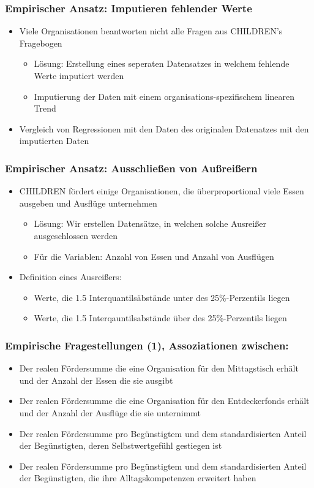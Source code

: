 \begin{frame}[fragile]
\frametitle{Empirischer Ansatz: Imputieren fehlender Werte}
\begin{itemize}
\item Viele Organisationen beantworten nicht alle Fragen aus CHILDREN's Fragebogen 
\begin{itemize}
\item Lösung: Erstellung eines seperaten Datensatzes in welchem fehlende Werte imputiert werden
\item Imputierung der Daten mit einem organisations-spezifischem linearen Trend
\end{itemize}
\item Vergleich von Regressionen mit den Daten des originalen Datenatzes mit den imputierten Daten
\end{itemize} 
\end{frame}


\begin{frame}[fragile]
\frametitle{Empirischer Ansatz: Ausschließen von Außreißern}
\begin{itemize}
\item CHILDREN fördert einige Organisationen, die überproportional viele Essen ausgeben und Ausflüge unternehmen 
\begin{itemize}
\item Lösung: Wir erstellen Datensätze, in welchen solche Ausreißer ausgeschlossen werden
\item Für die Variablen: Anzahl von Essen und Anzahl von Ausflügen
\end{itemize}
\item Definition eines Ausreißers: 
\begin{itemize}
\item Werte, die 1.5 Interquantilsäbstände unter des 25\%-Perzentils liegen
\item Werte, die 1.5 Interqauntilsabstände über des 25\%-Perzentils liegen
\end{itemize}
\end{itemize} 
\end{frame}

\begin{frame}[fragile]
\frametitle{Empirische Fragestellungen (1), Assoziationen zwischen:}
\begin{itemize}
\item Der realen Fördersumme die eine Organisation für den Mittagstisch erhält und der Anzahl der Essen die sie ausgibt
\item Der realen Fördersumme die eine Organisation für den Entdeckerfonds erhält und der Anzahl der Ausflüge die sie unternimmt
\item Der realen Fördersumme pro Begünstigtem und dem standardisierten Anteil der Begünstigten, deren Selbstwertgefühl gestiegen ist
\item Der realen Fördersumme pro Begünstigtem und dem standardisierten Anteil der Begünstigten, die ihre Alltagskompetenzen erweitert haben
\end{itemize} 
\end{frame}


